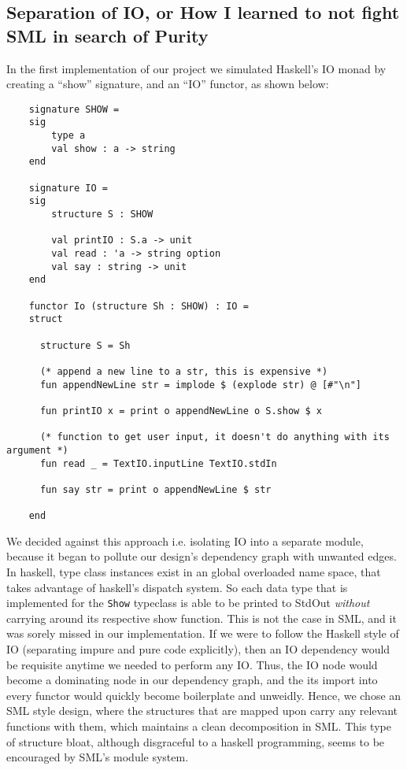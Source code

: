 \documentclass[9pt,letterpaper]{extarticle}
\begin{document}
  \subsection{Separation of IO, or How I learned to not fight SML in search of Purity}
  In the first implementation of our project we simulated Haskell's IO monad by
  creating a ``show'' signature, and an ``IO'' functor, as shown below:

  \begin{verbatim}
    signature SHOW =
    sig
        type a
        val show : a -> string
    end
    
    signature IO =
    sig
        structure S : SHOW
    
        val printIO : S.a -> unit
        val read : 'a -> string option
        val say : string -> unit
    end
    
    functor Io (structure Sh : SHOW) : IO =
    struct
    
      structure S = Sh
    
      (* append a new line to a str, this is expensive *)
      fun appendNewLine str = implode $ (explode str) @ [#"\n"]
    
      fun printIO x = print o appendNewLine o S.show $ x
    
      (* function to get user input, it doesn't do anything with its argument *)
      fun read _ = TextIO.inputLine TextIO.stdIn
    
      fun say str = print o appendNewLine $ str
    
    end
  \end{verbatim}
  We decided against this approach i.e. isolating IO into a separate module,
  because it began to pollute our design's dependency graph with unwanted edges.
  In haskell, type class instances exist in an global overloaded name space,
  that takes advantage of haskell's dispatch system. So each data type that is
  implemented for the \texttt{Show} typeclass is able to be printed to StdOut
  \textit{without} carrying around its respective show function. This is not the
  case in SML, and it was sorely missed in our implementation. If we were to
  follow the Haskell style of IO (separating impure and pure code explicitly),
  then an IO dependency would be requisite anytime we needed to perform any IO.
  Thus, the IO node would become a dominating node in our dependency graph, and
  the its import into every functor would quickly become boilerplate and
  unweidly. Hence, we chose an SML style design, where the structures that are
  mapped upon carry any relevant functions with them, which maintains a clean
  decomposition in SML. This type of structure bloat, although disgraceful to a
  haskell programming, seems to be encouraged by SML's module system.
\end{document}
